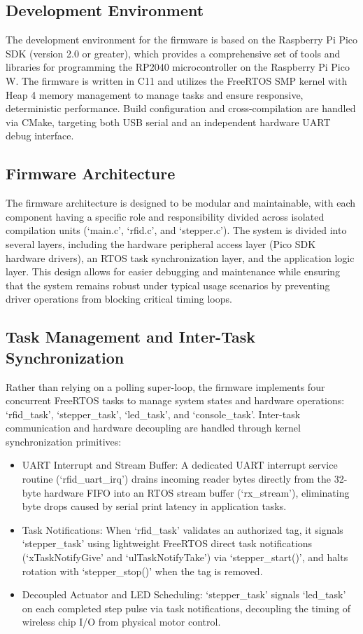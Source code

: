 \label{sec:software}

\subsection{Development Environment}
The development environment for the firmware is based on the Raspberry Pi Pico SDK (version 2.0 or greater), which provides a comprehensive set of tools and libraries for programming the RP2040 microcontroller on the Raspberry Pi Pico W. The firmware is written in C11 and utilizes the FreeRTOS SMP kernel with Heap 4 memory management to manage tasks and ensure responsive, deterministic performance. Build configuration and cross-compilation are handled via CMake, targeting both USB serial and an independent hardware UART debug interface.

\subsection{Firmware Architecture}
The firmware architecture is designed to be modular and maintainable, with each component having a specific role and responsibility divided across isolated compilation units (`main.c', `rfid.c', and `stepper.c'). The system is divided into several layers, including the hardware peripheral access layer (Pico SDK hardware drivers), an RTOS task synchronization layer, and the application logic layer. This design allows for easier debugging and maintenance while ensuring that the system remains robust under typical usage scenarios by preventing driver operations from blocking critical timing loops.

\subsection{Task Management and Inter-Task Synchronization}
Rather than relying on a polling super-loop, the firmware implements four concurrent FreeRTOS tasks to manage system states and hardware operations: `rfid\_task', `stepper\_task', `led\_task', and `console\_task'. Inter-task communication and hardware decoupling are handled through kernel synchronization primitives:

\begin{itemize}
    \item UART Interrupt and Stream Buffer: A dedicated UART interrupt service routine (`rfid\_uart\_irq') drains incoming reader bytes directly from the 32-byte hardware FIFO into an RTOS stream buffer (`rx\_stream'), eliminating byte drops caused by serial print latency in application tasks.
    \item Task Notifications: When `rfid\_task' validates an authorized tag, it signals `stepper\_task' using lightweight FreeRTOS direct task notifications (`xTaskNotifyGive' and `ulTaskNotifyTake') via `stepper\_start()', and halts rotation with `stepper\_stop()' when the tag is removed.
    \item Decoupled Actuator and LED Scheduling: `stepper\_task' signals `led\_task' on each completed step pulse via task notifications, decoupling the timing of wireless chip I/O from physical motor control.
\end{itemize}


